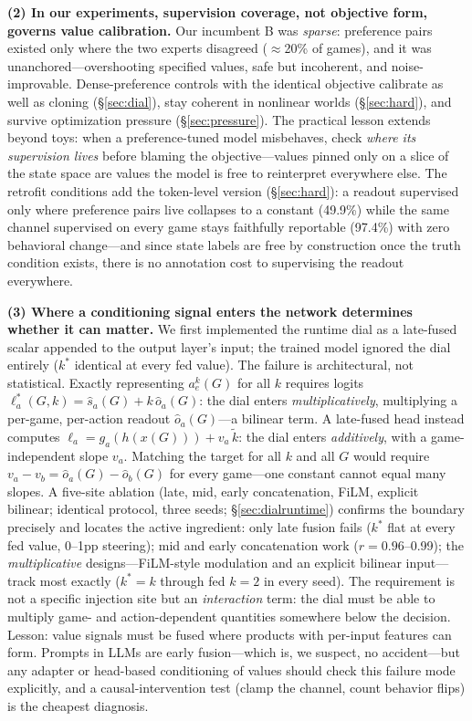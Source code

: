 \documentclass[manuscript, screen, review]{jair}
\begin{document}
\textbf{(2) In our experiments, supervision coverage, not objective form, governs value
calibration.} Our incumbent
B was \emph{sparse}: preference pairs existed only where the two experts disagreed
($\approx$20\% of games), and it was unanchored---overshooting specified values, safe but
incoherent, and noise-improvable. Dense-preference controls with the identical objective
calibrate as well as cloning (\S\ref{sec:dial}), stay coherent in nonlinear worlds
(\S\ref{sec:hard}), and survive optimization pressure (\S\ref{sec:pressure}). The practical
lesson extends beyond toys: when a preference-tuned model misbehaves, check \emph{where its
supervision lives} before blaming the objective---values pinned only on a slice of the state
space are values the model is free to reinterpret everywhere else. The retrofit conditions add
the token-level version (\S\ref{sec:hard}): a readout supervised only where preference pairs
live collapses to a constant (49.9\%) while the same channel supervised on every game stays
faithfully reportable (97.4\%) with zero behavioral change---and since state labels are free by
construction once the truth condition exists, there is no annotation cost to supervising the
readout everywhere.

\textbf{(3) Where a conditioning signal enters the network determines whether it can matter.}
We first implemented the runtime dial as a late-fused scalar appended to the output layer's
input; the trained model ignored the dial entirely ($k^*$ identical at every fed value). The
failure is architectural, not statistical. Exactly representing $a^{k}_{e}(G)$ for all $k$
requires logits $\ell^{*}_{a}(G, k) = \hat{s}_a(G) + k\,\hat{o}_a(G)$: the dial enters
\emph{multiplicatively}, multiplying a per-game, per-action readout $\hat{o}_a(G)$---a bilinear
term. A late-fused head instead computes $\ell_a = g_a(h(x(G))) + v_a\,\tilde{k}$: the dial
enters \emph{additively}, with a game-independent slope $v_a$. Matching the target for all $k$
and all $G$ would require $v_a - v_b = \hat{o}_a(G) - \hat{o}_b(G)$ for every game---one constant
cannot equal many slopes. A five-site ablation (late, mid, early concatenation, FiLM, explicit
bilinear; identical protocol, three seeds; \S\ref{sec:dialruntime}) confirms the boundary
precisely and locates the active ingredient: only late fusion fails ($k^*$ flat at every fed
value, 0--1pp steering); mid and early concatenation work ($r{=}0.96$--0.99); the
\emph{multiplicative} designs---FiLM-style modulation and an explicit bilinear input---track
most exactly ($k^*{=}k$ through fed $k{=}2$ in every seed). The requirement is not a specific
injection site but an \emph{interaction} term: the dial must be able to multiply game- and
action-dependent quantities somewhere below the decision. Lesson: value signals must be fused
where products with per-input features can form. Prompts in LLMs are early
fusion---which is, we suspect, no accident---but any adapter or head-based conditioning of
values should check this failure mode explicitly, and a causal-intervention test (clamp the
channel, count behavior flips) is the cheapest diagnosis.
\end{document}
